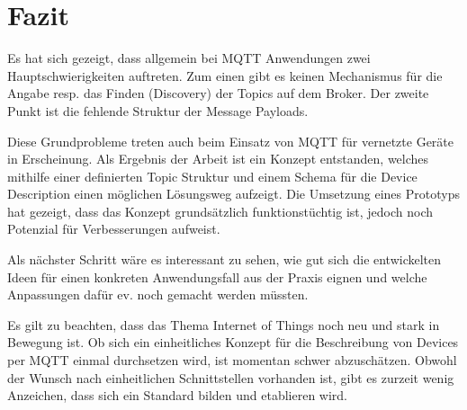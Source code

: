 \chapter{Fazit}
\label{chap:schlussfolgerungen}

Es hat sich gezeigt, dass allgemein bei MQTT Anwendungen zwei Hauptschwierigkeiten auftreten. Zum einen gibt es keinen Mechanismus für die Angabe resp. das Finden (Discovery) der Topics auf dem Broker. Der zweite Punkt ist die fehlende Struktur der Message Payloads. 

Diese Grundprobleme treten auch beim Einsatz von MQTT für vernetzte Geräte in Erscheinung. Als Ergebnis der Arbeit ist ein Konzept entstanden, welches mithilfe einer definierten Topic Struktur und einem Schema für die Device Description einen möglichen Lösungsweg aufzeigt. Die Umsetzung eines Prototyps hat gezeigt, dass das Konzept grundsätzlich funktionstüchtig ist, jedoch noch Potenzial für Verbesserungen aufweist.

Als nächster Schritt wäre es interessant zu sehen, wie gut sich die entwickelten Ideen für einen konkreten Anwendungsfall aus der Praxis eignen und welche Anpassungen dafür ev. noch gemacht werden müssten.


Es gilt zu beachten, dass das Thema Internet of Things noch neu und stark in Bewegung ist. Ob sich ein einheitliches Konzept für die Beschreibung von Devices per MQTT einmal durchsetzen wird, ist momentan schwer abzuschätzen. Obwohl der Wunsch nach einheitlichen Schnittstellen vorhanden ist, gibt  es zurzeit wenig Anzeichen, dass sich ein Standard bilden und etablieren wird.